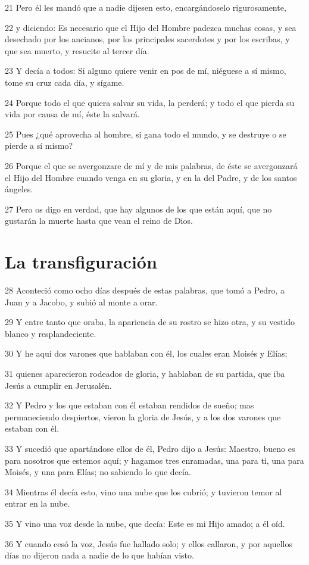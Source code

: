 \par 21 Pero él les mandó que a nadie dijesen esto, encargándoselo rigurosamente,
\par 22 y diciendo: Es necesario que el Hijo del Hombre padezca muchas cosas, y sea desechado por los ancianos, por los principales sacerdotes y por los escribas, y que sea muerto, y resucite al tercer día.
\par 23 Y decía a todos: Si alguno quiere venir en pos de mí, niéguese a sí mismo, tome su cruz cada día, y sígame.
\par 24 Porque todo el que quiera salvar su vida, la perderá; y todo el que pierda su vida por causa de mí, éste la salvará.
\par 25 Pues ¿qué aprovecha al hombre, si gana todo el mundo, y se destruye o se pierde a sí mismo?
\par 26 Porque el que se avergonzare de mí y de mis palabras, de éste se avergonzará el Hijo del Hombre cuando venga en su gloria, y en la del Padre, y de los santos ángeles.
\par 27 Pero os digo en verdad, que hay algunos de los que están aquí, que no gustarán la muerte hasta que vean el reino de Dios.

\section*{La transfiguración}

\par 28 Aconteció como ocho días después de estas palabras, que tomó a Pedro, a Juan y a Jacobo, y subió al monte a orar.
\par 29 Y entre tanto que oraba, la apariencia de su rostro se hizo otra, y su vestido blanco y resplandeciente.
\par 30 Y he aquí dos varones que hablaban con él, los cuales eran Moisés y Elías;
\par 31 quienes aparecieron rodeados de gloria, y hablaban de su partida, que iba Jesús a cumplir en Jerusalén.
\par 32 Y Pedro y los que estaban con él estaban rendidos de sueño; mas permaneciendo despiertos, vieron la gloria de Jesús, y a los dos varones que estaban con él.
\par 33 Y sucedió que apartándose ellos de él, Pedro dijo a Jesús: Maestro, bueno es para nosotros que estemos aquí; y hagamos tres enramadas, una para ti, una para Moisés, y una para Elías; no sabiendo lo que decía.
\par 34 Mientras él decía esto, vino una nube que los cubrió; y tuvieron temor al entrar en la nube.
\par 35 Y vino una voz desde la nube, que decía: Este es mi Hijo amado; a él oíd.
\par 36 Y cuando cesó la voz, Jesús fue hallado solo; y ellos callaron, y por aquellos días no dijeron nada a nadie de lo que habían visto.

